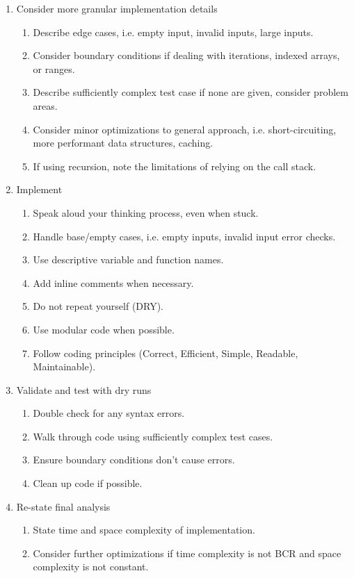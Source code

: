 \documentclass{article}
\begin{document}
\begin{enumerate}
     \item Consider more granular implementation details

    \begin{enumerate}
        \item Describe edge cases, i.e. empty input, invalid inputs, large inputs.
        \item Consider boundary conditions if dealing with iterations, indexed arrays, or ranges.
        \item Describe sufficiently complex test case if none are given, consider problem areas.
        \item Consider minor optimizations to general approach, i.e. short-circuiting, more performant data structures, caching.
        \item If using recursion, note the limitations of relying on the call stack.
    \end{enumerate}
    
    \item Implement
    \begin{enumerate}
        \item Speak aloud your thinking process, even when stuck.
        \item Handle base/empty cases, i.e. empty inputs, invalid input error checks.
        \item Use descriptive variable and function names.
        \item Add inline comments when necessary.
        \item Do not repeat yourself (DRY).
        \item Use modular code when possible.
        \item Follow coding principles (Correct, Efficient, Simple, Readable, Maintainable).
    \end{enumerate}
    
     \item Validate and test with dry runs
    \begin{enumerate}
        \item Double check for any syntax errors.
        \item Walk through code using sufficiently complex test cases.
        \item Ensure boundary conditions don't cause errors.
        \item Clean up code if possible.
    \end{enumerate}
    
     \item Re-state final analysis
    \begin{enumerate}
        \item State time and space complexity of implementation.
        \item Consider further optimizations if time complexity is not BCR and space complexity is not constant.
    \end{enumerate}
\end{enumerate}
\end{document}
